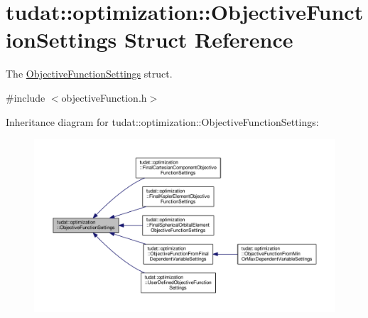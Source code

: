 \hypertarget{structtudat_1_1optimization_1_1ObjectiveFunctionSettings}{}\section{tudat\+:\+:optimization\+:\+:Objective\+Function\+Settings Struct Reference}
\label{structtudat_1_1optimization_1_1ObjectiveFunctionSettings}


The \hyperlink{structtudat_1_1optimization_1_1ObjectiveFunctionSettings}{Objective\+Function\+Settings} struct.  




{\ttfamily \#include $<$objective\+Function.\+h$>$}



Inheritance diagram for tudat\+:\+:optimization\+:\+:Objective\+Function\+Settings\+:
\nopagebreak
\begin{figure}[H]
\begin{center}
\leavevmode
\includegraphics[width=350pt]{structtudat_1_1optimization_1_1ObjectiveFunctionSettings__inherit__graph}
\end{center}
\end{figure}
